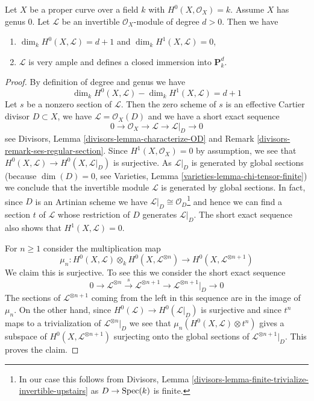 \begin{lemma}
\label{lemma-genus-zero-positive-degree}
Let $X$ be a proper curve over a field $k$ with $H^0(X, \mathcal{O}_X) = k$.
Assume $X$ has genus $0$. Let $\mathcal{L}$ be an invertible
$\mathcal{O}_X$-module of degree $d > 0$. Then we have
\begin{enumerate}
\item $\dim_k H^0(X, \mathcal{L}) = d + 1$ and $\dim_k H^1(X, \mathcal{L}) = 0$,
\item $\mathcal{L}$ is very ample and defines a closed immersion into
$\mathbf{P}^d_k$.
\end{enumerate}
\end{lemma}

\begin{proof}
By definition of degree and genus we have
$$
\dim_k H^0(X, \mathcal{L}) - \dim_k H^1(X, \mathcal{L}) = d + 1
$$
Let $s$ be a nonzero section of $\mathcal{L}$.
Then the zero scheme of $s$ is an effective Cartier
divisor $D \subset X$, we have $\mathcal{L} = \mathcal{O}_X(D)$ and
we have a short exact sequence
$$
0 \to \mathcal{O}_X \to \mathcal{L} \to \mathcal{L}|_D \to 0
$$
see Divisors, Lemma \ref{divisors-lemma-characterize-OD} and
Remark \ref{divisors-remark-ses-regular-section}.
Since $H^1(X, \mathcal{O}_X) = 0$ by assumption, we see that
$H^0(X, \mathcal{L}) \to H^0(X, \mathcal{L}|_D)$ is surjective.
As $\mathcal{L}|_D$ is generated by global sections
(because $\dim(D) = 0$, see
Varieties, Lemma \ref{varieties-lemma-chi-tensor-finite})
we conclude that the invertible module $\mathcal{L}$
is generated by global sections.
In fact, since $D$ is an Artinian scheme we have
$\mathcal{L}|_D \cong \mathcal{O}_D$\footnote{In our case this
follows from Divisors, Lemma
\ref{divisors-lemma-finite-trivialize-invertible-upstairs}
as $D \to \mathop{\mathrm{Spec}}(k)$ is finite.} and hence we can
find a section $t$ of $\mathcal{L}$ whose restriction
of $D$ generates $\mathcal{L}|_D$.
The short exact sequence also shows that $H^1(X, \mathcal{L}) = 0$.

\medskip\noindent
For $n \geq 1$ consider the multiplication map
$$
\mu_n :
H^0(X, \mathcal{L}) \otimes_k H^0(X, \mathcal{L}^{\otimes n})
\longrightarrow
H^0(X, \mathcal{L}^{\otimes n + 1})
$$
We claim this is surjective. To see this we consider the short exact
sequence
$$
0 \to \mathcal{L}^{\otimes n} \xrightarrow{s}
\mathcal{L}^{\otimes n + 1} \to \mathcal{L}^{\otimes n + 1}|_D \to 0
$$
The sections of $\mathcal{L}^{\otimes n + 1}$ coming from the left in this
sequence are in the image of $\mu_n$. On the other hand, since
$H^0(\mathcal{L}) \to H^0(\mathcal{L}|_D)$ is surjective and since
$t^n$ maps to a trivialization of $\mathcal{L}^{\otimes n}|_D$
we see that $\mu_n(H^0(X, \mathcal{L}) \otimes t^n)$ gives a subspace
of $H^0(X, \mathcal{L}^{\otimes n + 1})$ surjecting onto the global sections of
$\mathcal{L}^{\otimes n + 1}|_D$. This proves the claim.


\end{proof}
